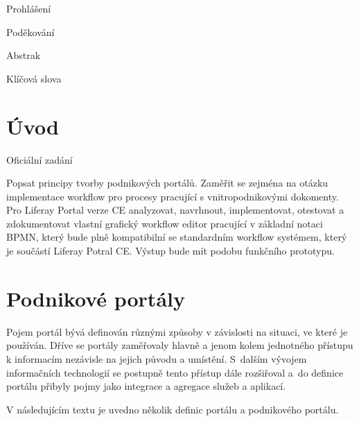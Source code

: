 \documentclass{fithesis}
\begin{document}
\FrontMatter
\ThesisTitlePage

\begin{ThesisDeclaration}
Prohlášení\AdvisorName
\end{ThesisDeclaration}

\begin{ThesisThanks}
Poděkování
\end{ThesisThanks}

\begin{ThesisAbstract}
Abstrak
\end{ThesisAbstract}

\begin{ThesisKeyWords}
Klíčová slova
\end{ThesisKeyWords}


\MainMatter
\setcounter{secnumdepth}{4}
\tableofcontents

\chapter{Úvod}
Oficiální zadání

Popsat principy tvorby podnikových portálů. Zaměřit se zejména na otázku implementace workflow pro procesy pracující s vnitropodnikovými dokomenty. Pro Liferay Portal verze CE analyzovat, navrhnout, implementovat, otestovat a zdokumentovat vlastní grafický workflow editor pracující v základní notaci BPMN, který bude plně kompatibilní se standardním workflow systémem, který je součástí Liferay Potral CE. Výstup bude mít podobu funkčního prototypu.













\chapter{Podnikové portály}

Pojem portál bývá definován různými způsoby v závislosti na situaci, ve které je používán. Dříve se portály zaměřovaly hlavně a jenom kolem jednotného přístupu k informacím nezávisle na jejich původu a umístění. S~dalším vývojem informačních technologií se postupně tento přístup dále rozšiřoval a~do definice portálu přibyly pojmy jako integrace a agregace služeb a aplikací. 

V následujícím textu je uvedno několik definic portálu a podnikového portálu.
\end{document}
